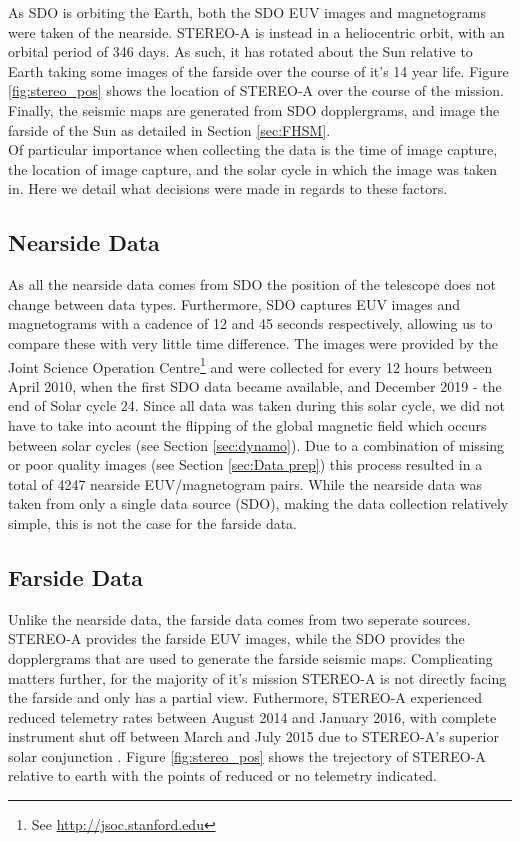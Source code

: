 \documentclass[11pt,a4paper,onecolumn]{report}
\begin{document}
As SDO is orbiting the Earth, both the SDO EUV images and magnetograms were
taken of the nearside. STEREO-A is instead in a heliocentric orbit, with an
orbital period of 346 days. As such, it has rotated about the Sun relative to
Earth taking some images of the farside over the course of it's 14 year life.
Figure \ref{fig:stereo_pos} shows the location of STEREO-A over the course of
the mission. Finally, the seismic maps are generated from SDO dopplergrams, and
image the farside of the Sun as detailed in Section \ref{sec:FHSM}. \\

Of particular importance when collecting the data is the time of image capture, the
location of image capture, and the solar cycle in which the image was taken in.
Here we detail what decisions were made in regards to these factors.



\subsection{Nearside Data}
As all the nearside data comes from SDO the position of the telescope does not
change between data types. Furthermore, SDO captures EUV images and magnetograms
with a cadence of 12 and 45 seconds respectively, allowing us to compare these
with very little time difference. The images were provided by the Joint Science
Operation Centre\footnote{See \url{http://jsoc.stanford.edu}} and were
collected for every 12 hours between April 2010, when the first SDO data became
available, and December 2019 - the end of Solar cycle 24. Since all data was
taken during this solar cycle, we did not have to take into acount the flipping
of the global magnetic field which occurs between solar cycles (see Section
\ref{sec:dynamo}). Due to a combination of missing or poor quality images (see
Section \ref{sec:Data prep}) this process resulted in a total of 4247 nearside
EUV/magnetogram pairs. While the nearside data was taken from only a single data
source (SDO), making the data collection relatively simple, this is not the case
for the farside data.

\subsection{Farside Data}
Unlike the nearside data, the farside data comes from two seperate sources.
STEREO-A provides the farside EUV images, while the SDO provides the
dopplergrams that are used to generate the farside seismic maps. Complicating
matters further, for the majority of it's mission STEREO-A is not directly
facing the farside and only has a partial view. Futhermore, STEREO-A experienced
reduced telemetry rates between August 2014 and January 2016, with complete
instrument shut off between March and July 2015 due to STEREO-A's superior
solar conjunction \citep{ossing_stereo_2017}. Figure \ref{fig:stereo_pos} shows
the trejectory of STEREO-A relative to earth with the points of reduced or no
telemetry indicated. \\
\end{document}
